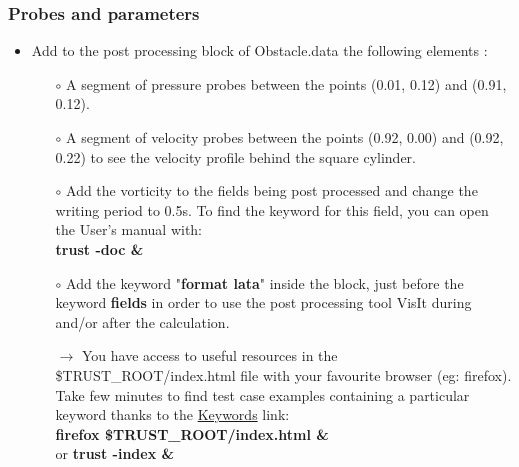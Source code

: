 \documentclass[10pt]{beamer}
\begin{document}
\begin{frame}
\frametitle{Probes and parameters}
\begin{block}{}

\begin{itemize}
\item Add to the post processing block of Obstacle.data the following elements :\\

    \begin{itemize}
    \item [$\circ$] A segment of pressure probes between the points (0.01, 0.12) and (0.91, 0.12).
    \vspace{0.1cm}

    \item [$\circ$] A segment of velocity probes between the points (0.92, 0.00) and (0.92, 0.22) to see the velocity profile behind the square cylinder.
    \vspace{0.1cm}

    \item [$\circ$] Add the vorticity to the fields being post processed and change the writing period to 0.5s. To find the keyword for this field, you can open the User's manual with:\\
    \textbf{trust -doc \&}
    \vspace{0.1cm}

    \item [$\circ$] Add the keyword "\textbf{format lata}" inside the block, just before the keyword \textbf{fields} in order to use the post processing tool VisIt during and/or after the calculation.
    \vspace{0.1cm}

    \item [$\rightarrow$] You have access to useful resources in the \$TRUST\_ROOT/index.html file with your favourite browser (eg: firefox). Take few minutes to find test case examples containing a particular keyword thanks to the \underline{Keywords} link: \\
    \textbf{firefox \$TRUST\_ROOT/index.html \&} \\
    or \textbf{trust -index \&}\\
    \end{itemize}
\end{itemize}

\end{block}
\end{frame}
\end{document}
